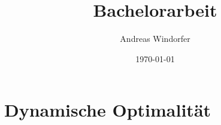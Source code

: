 \documentclass[a4paper,12pt]{article}
\title{Bachelorarbeit}
\author{

	Andreas Windorfer\\
}
\date{\today}
\begin{document}
\maketitle
\newpage

\newpage
\tableofcontents


\newpage


\section{Dynamische Optimalität}
\newpage


\end{document}
